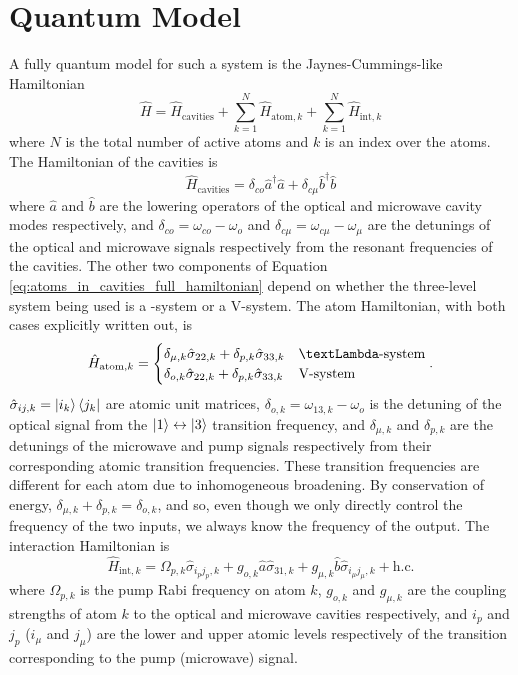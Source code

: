 \section{\label{sec:3lt_quantum_model}Quantum Model}
A fully quantum model for such a system is the Jaynes-Cummings-like Hamiltonian\cite{barnett_longdell_2020}
\begin{equation}
\label{eq:atoms_in_cavities_full_hamiltonian}
    \hat{H} = \hat{H}_\text{cavities} + \sum_{k=1}^{N} \hat{H}_{\text{atom},k} + \sum_{k=1}^{N} \hat{H}_{\text{int},k}
\end{equation}
where $N$ is the total number of active atoms and $k$ is an index over the atoms. The Hamiltonian of the cavities is
\begin{equation}
    \hat{H}_\text{cavities} = \delta_{co} \hat{a}^\dagger\hat{a} + \delta_{c\mu} \hat{b}^\dagger\hat{b}
\end{equation}
where $\hat{a}$ and $\hat{b}$ are the lowering operators of the optical and microwave cavity modes respectively, and $\delta_{co} = \omega_{co} - \omega_o$ and $\delta_{c\mu} = \omega_{c\mu} - \omega_\mu$ are the detunings of the optical and microwave signals respectively from the resonant frequencies of the cavities. The other two components of Equation \ref{eq:atoms_in_cavities_full_hamiltonian} depend on whether the three-level system being used is a \textLambda-system or a V-system. The atom Hamiltonian, with both cases explicitly written out, is
\begin{equation}
    \hat{H}_{\text{atom},k} =
    \begin{cases}
        \delta_{\mu,k} \hat{\sigma}_{22,k} + \delta_{p,k} \hat{\sigma}_{33,k} & \text{\textLambda-system}\\
        \delta_{o,k} \hat{\sigma}_{22,k} + \delta_{p,k} \hat{\sigma}_{33,k} & \text{V-system}
    \end{cases}.
\end{equation}
$\hat{\sigma}_{ij,k} = \left|i_k\right\rangle\left\langle j_k\right|$ are atomic unit matrices, $\delta_{o,k} = \omega_{13,k} - \omega_o$ is the detuning of the optical signal from the $\left|1\right\rangle\leftrightarrow\left|3\right\rangle$ transition frequency, and $\delta_{\mu,k}$ and $\delta_{p,k}$ are the detunings of the microwave and pump signals respectively from their corresponding atomic transition frequencies. These transition frequencies are different for each atom due to inhomogeneous broadening. By conservation of energy, $\delta_{\mu,k} + \delta_{p,k} = \delta_{o,k}$, and so, even though we only directly control the frequency of the two inputs, we always know the frequency of the output. The interaction Hamiltonian is
\begin{equation}
    \hat{H}_{\text{int},k} = \Omega_{p,k}\hat{\sigma}_{i_p j_p,k} + g_{o,k}\hat{a}\hat{\sigma}_{31,k} + g_{\mu,k}\hat{b}\hat{\sigma}_{i_\mu j_\mu,k} + \text{h.c.}
\end{equation}
where $\Omega_{p,k}$ is the pump Rabi frequency on atom $k$, $g_{o,k}$ and $g_{\mu,k}$ are the coupling strengths of atom $k$ to the optical and microwave cavities respectively, and $i_p$ and $j_p$ ($i_\mu$ and $j_\mu$) are the lower and upper atomic levels respectively of the transition corresponding to the pump (microwave) signal.

